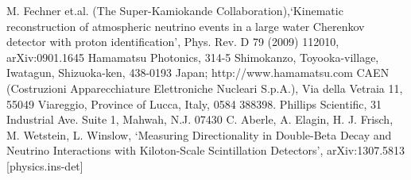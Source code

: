 \documentclass[preprint,12pt]{elsarticle}
\begin{document}





 \begin{thebibliography}{00}

 M. Fechner et.al. (The Super-Kamiokande Collaboration),`Kinematic reconstruction of atmospheric neutrino events in a large water Cherenkov detector with proton identification', Phys. Rev. D 79 (2009) 112010, arXiv:0901.1645
 Hamamatsu Photonics, 314-5 Shimokanzo, Toyooka-village, Iwatagun, Shizuoka-ken, 438-0193 Japan; http://www.hamamatsu.com
 CAEN (Costruzioni Apparecchiature Elettroniche Nucleari S.p.A.), Via della Vetraia 11, 55049 Viareggio, Province of Lucca, Italy, 0584 388398.
 Phillips Scientific, 31 Industrial Ave. Suite 1, Mahwah, N.J.  07430
 C. Aberle, A. Elagin, H. J. Frisch, M. Wetstein, L. Winslow, `Measuring Directionality in Double-Beta Decay and Neutrino Interactions with Kiloton-Scale Scintillation Detectors', arXiv:1307.5813 [physics.ins-det]



 \end{thebibliography}
\end{document}
